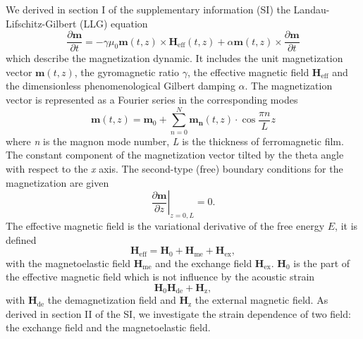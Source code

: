 \documentclass[%
superscriptaddress,
preprint,
showpacs,
amsmath,
amssymb,
aps,
prl,
]{revtex4-1}
\begin{document}
We derived in section I of the supplementary information (SI) the Landau-Lifschitz-Gilbert (LLG) equation
\begin{equation}
	\frac{\partial \mathbf{m}}{\partial t} = - \gamma \mu_0 \mathbf{m} \left( t, z \right) \times \mathbf{H}_{\mathrm{eff}} \left( t, z \right) + \alpha \mathbf{m} \left( t, z \right) \times \frac{\partial \mathbf{m}}{\partial t}
	\label{eq:LLG}
\end{equation}
which describe the magnetization dynamic.
It includes the unit magnetization vector $\mathbf{m}\left(t,z\right)$, the gyromagnetic ratio $\gamma$, the effective magnetic field $\mathbf{H}_{\mathrm{eff}}$ and the dimensionless phenomenological Gilbert damping $\alpha$.
The magnetization vector is represented as a Fourier series in the corresponding modes 
\begin{equation}
	\mathbf{m} \left(t,z\right) = \mathbf{m}_0 + \sum_{n=0}^{N}{\mathbf{m_n}\left(t,z\right)} \cdot \cos{\frac{\pi n}{L}z}
	\label{eq:Fourier}
\end{equation}
where \textit{n} is the magnon mode number, \textit{L} is the thickness of ferromagnetic film. The constant component of the magnetization vector tilted by the theta angle with respect to the \textit{x} axis.  The second-type (free) boundary conditions for the magnetization are given
\begin{equation}
	\left.\frac{\partial \mathbf{m}}{\partial z}\right|_{z=0,L} = 0.
	\label{eq:Boundary_cond}
\end{equation}
The effective magnetic field is the variational derivative of the free energy $E$, it is defined
\begin{equation}
    \mathbf{H}_{\mathrm{eff}} = \mathbf{H}_0 + \mathbf{H}_{\mathrm{me}} + \mathbf{H}_{\mathrm{ex}},
    \label{eq:Heff}
\end{equation}
with the magnetoelastic field $\mathbf{H}_{\mathrm{me}}$ and the exchange field $\mathbf{H}_{\mathrm{ex}}$.
$\mathbf{H}_0$ is the part of the effective magnetic field which is not influence by the acoustic strain
\begin{equation}
    \mathbf{H}_0  \mathbf{H}_{\mathrm{de}} + \mathbf{H}_{\mathrm{z}},
\end{equation}
with $\mathbf{H}_{\mathrm{de}}$ the demagnetization field and $\mathbf{H}_{\mathrm{z}}$ the external magnetic field.
As derived in section II of the SI, we investigate the strain dependence of two field: the exchange field and the magnetoelastic field.
\end{document}
